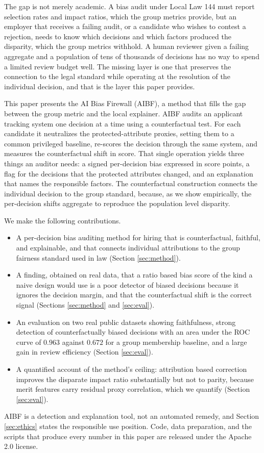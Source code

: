 \documentclass[conference]{IEEEtran}
\begin{document}
The gap is not merely academic. A bias audit under Local Law 144 must report selection
rates and impact ratios, which the group metrics provide, but an employer that
receives a failing audit, or a candidate who wishes to contest a rejection, needs to
know which decisions and which factors produced the disparity, which the group metrics
withhold. A human reviewer given a failing aggregate and a population of tens of
thousands of decisions has no way to spend a limited review budget well. The missing
layer is one that preserves the connection to the legal standard while operating at
the resolution of the individual decision, and that is the layer this paper provides.

This paper presents the AI Bias Firewall (AIBF), a method that fills the gap between
the group metric and the local explainer. AIBF audits an applicant tracking system
one decision at a time using a counterfactual test. For each candidate it neutralizes
the protected-attribute proxies, setting them to a common privileged baseline,
re-scores the decision through the same system, and measures the counterfactual
shift in score. That single operation yields three things an auditor needs: a signed
per-decision bias expressed in score points, a flag for the decisions that the
protected attributes changed, and an explanation that names the responsible
factors. The counterfactual construction connects the individual decision to the
group standard, because, as we show empirically, the per-decision shifts aggregate to
reproduce the population level disparity.

We make the following contributions.
\begin{itemize}
\item A per-decision bias auditing method for hiring that is counterfactual,
faithful, and explainable, and that connects individual attributions to the group
fairness standard used in law (Section \ref{sec:method}).
\item A finding, obtained on real data, that a ratio based bias score of the kind a
naive design would use is a poor detector of biased decisions because it ignores the
decision margin, and that the counterfactual shift is the correct signal (Sections
\ref{sec:method} and \ref{sec:eval}).
\item An evaluation on two real public datasets showing faithfulness, strong
detection of counterfactually biased decisions with an area under the ROC curve of
$0.963$ against $0.672$ for a group membership baseline, and a large gain in review
efficiency (Section \ref{sec:eval}).
\item A quantified account of the method's ceiling: attribution based correction
improves the disparate impact ratio substantially but not to parity, because merit
features carry residual proxy correlation, which we quantify (Section
\ref{sec:eval}).
\end{itemize}
AIBF is a detection and explanation tool, not an automated remedy, and Section
\ref{sec:ethics} states the responsible use position. Code, data preparation, and the
scripts that produce every number in this paper are released under the Apache 2.0
license.
\end{document}
